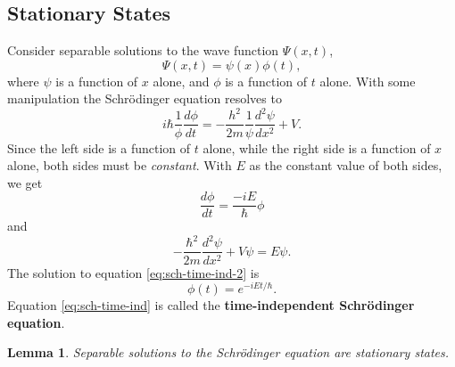 \documentclass{article}
\newtheorem*{lemma*}{Lemma}
\begin{document}
\subsection{Stationary States}

Consider separable solutions to the wave function $\Psi(x, t)$,
\begin{equation} \label{eq:sch-time-ind-1}
  \Psi(x, t) = \psi(x)\phi(t),
\end{equation} where $\psi$ is a function of $x$ alone, and $\phi$ is a
function of $t$ alone. With some manipulation the Schr\"{o}dinger equation
resolves to \[
  i\hbar \frac{1}{\phi} \frac{d\phi}{dt}
  = -\frac{h^2}{2m} \frac{1}{\psi} \frac{d^2\psi}{dx^2} + V.
\] Since the left side is a function of $t$ alone, while the right side is a
function of $x$ alone, both sides must be \emph{constant}. With $E$ as the
constant value of both sides, we get
\begin{equation} \label{eq:sch-time-ind-2}
  \frac{d\phi}{dt} = \frac{-iE}{\hbar} \phi
\end{equation}
and
\begin{equation} \label{eq:sch-time-ind}
  \boxed{
    -\frac{\hbar^2}{2m} \frac{d^2\psi}{dx^2} + V\psi = E\psi.
  }
\end{equation}
The solution to equation \eqref{eq:sch-time-ind-2} is
\begin{equation} \label{eq:sch-time-ind-psi}
  \boxed{
    \phi(t) = e^{-iEt/\hbar}.
  }
\end{equation}
Equation \eqref{eq:sch-time-ind} is called the \textbf{time-independent
Schr\"{o}dinger equation}.

\begin{lemma*}
  Separable solutions to the Schr\"{o}dinger equation are \emph{stationary
  states}.
\end{lemma*}
\end{document}
